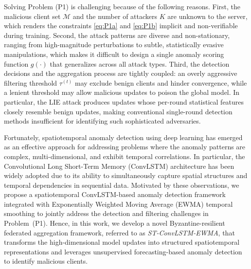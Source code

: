 Solving Problem (P1) is challenging because of the following reasons. First, the malicious client set $\mathcal{M}$ and the number of attackers $K$ are unknown to the server, which renders the constraints \eqref{eq:P1a} and \eqref{eq:P1b} implicit and non-verifiable during training. Second, the attack patterns are diverse and non-stationary, ranging from high-magnitude perturbations to subtle, statistically evasive manipulations, which makes it difficult to design a single anomaly scoring function $g(\cdot)$ that generalizes across all attack types. Third, the detection decisions and the aggregation process are tightly coupled: an overly aggressive filtering threshold $\tau^{(t)}$ may exclude benign clients and hinder convergence, while a lenient threshold may allow malicious updates to poison the global model. In particular, the LIE attack produces updates whose per-round statistical features closely resemble benign updates, making conventional single-round detection methods insufficient for identifying such sophisticated adversaries.

Fortunately, spatiotemporal anomaly detection using deep learning has emerged as an effective approach for addressing problems where the anomaly patterns are complex, multi-dimensional, and exhibit temporal correlations. In particular, the Convolutional Long Short-Term Memory (ConvLSTM) architecture has been widely adopted due to its ability to simultaneously capture spatial structures and temporal dependencies in sequential data. Motivated by these observations, we propose a spatiotemporal ConvLSTM-based anomaly detection framework integrated with Exponentially Weighted Moving Average (EWMA) temporal smoothing to jointly address the detection and filtering challenges in Problem~(P1). Hence, in this work, we develop a novel Byzantine-resilient federated aggregation framework, referred to as \textit{ST-ConvLSTM-EWMA}, that transforms the high-dimensional model updates into structured spatiotemporal representations and leverages unsupervised forecasting-based anomaly detection to identify malicious clients.
